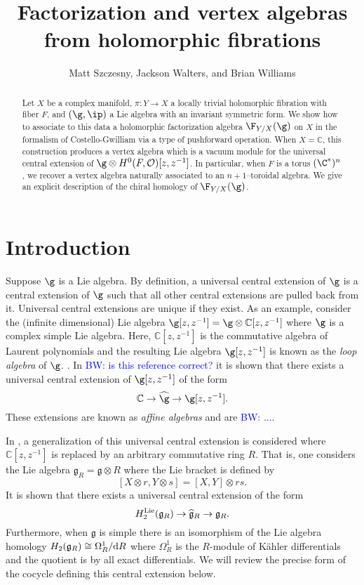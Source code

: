 \documentclass[12pt]{amsart}
\theoremstyle{definition}
\theoremstyle{remark}
\newcommand{\mc}{\mathcal}
\def\d{{\rm d}}
\def\tensor{\otimes}
\def\Hat{\widehat}
\def\fg{\mathfrak{g}}
\def\brian{\textcolor{blue}{BW: }\textcolor{blue}}
\begin{document}
 \title{Factorization and vertex algebras from  holomorphic fibrations}
  \author{Matt Szczesny, Jackson Walters, and Brian Williams}
  \date{}

  
  \maketitle

\begin{abstract}
Let $X$ be a complex manifold, $\pi: Y \rightarrow X$ a locally trivial holomorphic fibration with fiber $F$, and $(\g, \ip )$ a Lie algebra with an invariant symmetric form. We show how to associate to this data a holomorphic factorization algebra  $\F_{Y/X}(\g)$ on $X$ in the formalism of Costello-Gwilliam via a type of pushforward operation. When $X=\mathbb{C}$, this construction produces a vertex algebra which is a vacuum module for the universal central extension of $\g \otimes H^{0}(F, \mc{O})[z,z^{-1}]$. In particular,  when $F$ is a torus $(\C^{*})^n$, we recover a vertex algebra naturally associated to an $n+1$--toroidal algebra. We give an explicit description of the chiral homology of $\F_{Y/X}(\g)$.
\end{abstract}




\section{Introduction}

Suppose $\g$ is a Lie algebra. 
By definition, a universal central extension of $\g$ is a central extension of $\g$ such that all other central extensions are pulled back from it. 
Universal central extensions are unique if they exist. 
As an example, consider the (infinite dimensional) Lie algebra $\g[z,z^{-1}] = \g \tensor \mathbb{C}[z,z^{-1}]$ where $\g$ is a complex simple Lie algebra. 
Here, $\mathbb{C}[z,z^{-1}]$ is the commutative algebra of Laurent polynomials and the resulting Lie algebra $\g[z,z^{-1}]$ is known as the {\em loop algebra} of $\g$. . 
In \cite{Garland} \brian{is this reference correct?} it is shown that there exists a universal central extension of $\g[z,z^{-1}]$ of the form
\[
\mathbb{C} \to \Hat{\g} \to \g[z,z^{-1}] .
\]
These extensions are known as {\em affine algebras} and are \brian{...}.

In \cite{Kassel}, a generalization of this universal central extension is considered where $\mathbb{C}[z,z^{-1}]$ is replaced by an arbitrary commutative ring $R$. 
That is, one considers the Lie algebra $\fg_R = \fg \tensor R$ where the Lie bracket is defined by 
\[
[X \tensor r, Y \tensor s] = [X,Y] \tensor rs .
\]
It is shown that there exists a universal central extension of the form
\[
H_2^{\rm Lie}(\fg_R) \to \Hat{\fg}_R \to \fg_R .
\]
Furthermore, when $\fg$ is simple there is an isomorphism of the Lie algebra homology $H_2(\fg_R) \cong \Omega^1_R / \d R$ where $\Omega^1_R$ is the $R$-module of K\"{a}hler differentials and the quotient is by all exact differentials. 
We will review the precise form of the cocycle defining this central extension below. 
\end{document}
